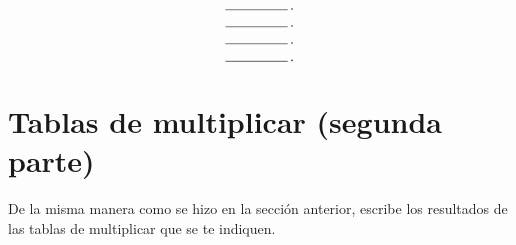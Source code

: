 \documentclass[11pt]{article}
\begin{document}
\begin{center}
\begin{multicols}{5}
    \begin{equation} \text{\line(1,0){45}\,.} \end{equation}

    \begin{equation} \text{\line(1,0){45}\,.} \end{equation}

    \begin{equation} \text{\line(1,0){45}\,.} \end{equation}

    \begin{equation} \text{\line(1,0){45}\,.} \end{equation}

\end{multicols}
\end{center}

\setcounter{equation}{0} 

\section{Tablas de multiplicar {\normalsize(segunda parte)}}
De la misma manera como se hizo en la secci\'on anterior, escribe los
resultados de las tablas de multiplicar que se te indiquen.
\end{document}
